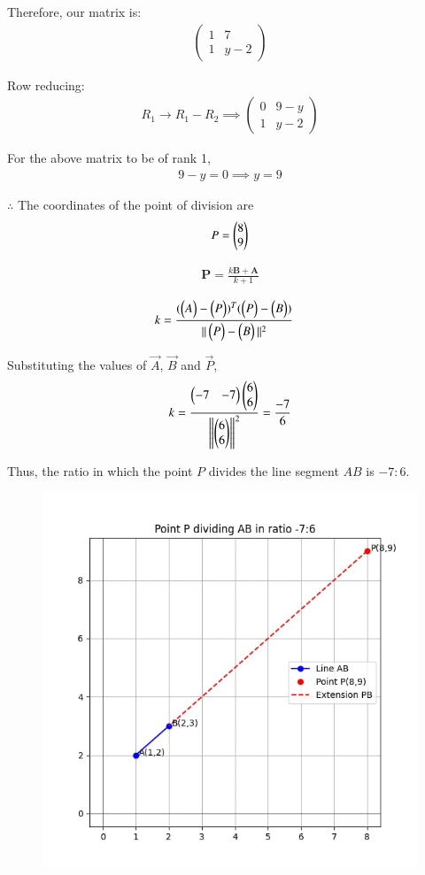 \documentclass[journal]{IEEEtran}
\begin{document}
Therefore, our matrix is:
\begin{align}
\begin{pmatrix}
1 & 7 \\
1 & y-2
\end{pmatrix}
\end{align}

Row reducing:
\begin{align}
R_1 \rightarrow R_1 - R_2 \implies
\begin{pmatrix}
0 & 9-y \\
1 & y-2
\end{pmatrix}
\end{align}

For the above matrix to be of rank 1,
\begin{align}
9-y = 0 \implies y = 9
\end{align}

$\therefore$ The coordinates of the point of division are
\begin{align*}
P = \begin{pmatrix}8 \\ 9\end{pmatrix}
\end{align*}

\begin{align}
    \textbf{P} = \frac{k\textbf{B}+\textbf{A}}{k+1}
\end{align}

\begin{align}
k &= \frac{(\begin{pmatrix}A\end{pmatrix} - \begin{pmatrix}P\end{pmatrix})^T (\begin{pmatrix}P\end{pmatrix} - \begin{pmatrix}B\end{pmatrix})}{\|\begin{pmatrix}P\end{pmatrix} - \begin{pmatrix}B\end{pmatrix}\|^2}
\end{align}

Substituting the values of $\vec{A}$, $\vec{B}$ and $\vec{P}$,
\begin{align}
k=\frac{\begin{pmatrix}-7 & -7\end{pmatrix}\begin{pmatrix}6 \\ 6\end{pmatrix}}{\left\lVert\begin{pmatrix}6 \\ 6\end{pmatrix}\right\rVert^2}=\frac{-7}{6}
\end{align}

Thus, the ratio in which the point $P$ divides the line segment $AB$ is $\boxed{-7:6}$.


\begin{figure}[H]
    \centering
    \includegraphics[width=0.8\columnwidth]{figs/fig1.jpg}
    \caption{}
    \label{fig:placeholder}
\end{figure}
\end{document}
